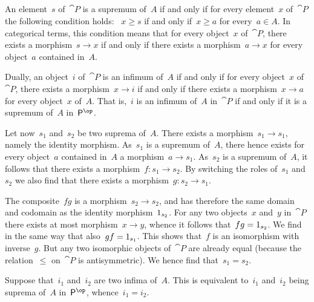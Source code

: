 \subsection{}

An element~$s$ of~$\cat{P}$ is a supremum of~$A$ if and only if for every element~$x$ of~$\cat{P}$ the following condition holds:~%
$x ≥ s$ if and only if~$x ≥ a$ for every~$a ∈ A$.
In categorical terms, this condition means that for every object~$x$ of~$\cat{P}$, there exists a morphism~$s \to x$ if and only if there exists a morphism~$a \to x$ for every object~$a$ contained in~$A$.

Dually, an object~$i$ of~$\cat{P}$ is an infimum of~$A$ if and only if for every object~$x$ of~$\cat{P}$, there exists a morphism~$x \to i$ if and only if there exists a morphism~$x \to a$ for every object~$x$ of~$A$.
That is,~$i$ is an infimum of~$A$ in~$\cat{P}$ if and only if it is a supremum of~$A$ in~$\cat{P}^{\op}$.

Let now~$s_1$ and~$s_2$ be two suprema of~$A$.
There exists a morphism~$s_1 \to s_1$, namely the identity morphism.
As~$s_1$ is a supremum of~$A$, there hence exists for every object~$a$ contained in~$A$ a morphism~$a \to s_1$.
As~$s_2$ is a supremum of~$A$, it follows that there exists a morphism~$f \colon s_1 \to s_2$.
By switching the roles of~$s_1$ and~$s_2$ we also find that there exists a morphism~$g \colon s_2 \to s_1$.

The composite~$f g$ is a morphism~$s_2 \to s_2$, and has therefore the same domain and codomain as the identity morphism~$1_{s_2}$.
For any two objects~$x$ and~$y$ in~$\cat{P}$ there exists at most morphism~$x \to y$, whence it follows that~$f g = 1_{s_2}$.
We find in the same way that also~$g f = 1_{s_1}$.
This shows that~$f$ is an isomorphism with inverse~$g$.
But any two isomorphic objects of~$\cat{P}$ are already equal (because the relation~$≤$ on~$\cat{P}$ is antisymmetric).
We hence find that~$s_1 = s_2$.

Suppose that~$i_1$ and~$i_2$ are two infima of~$A$.
This is equivalent to~$i_1$ and~$i_2$ being suprema of~$A$ in~$\cat{P}^{\op}$, whence~$i_1 = i_2$.
